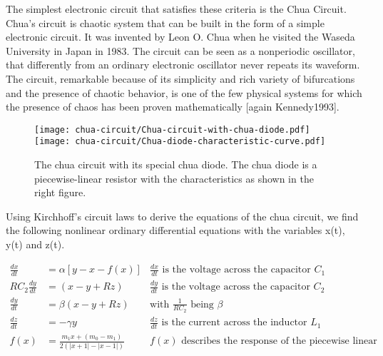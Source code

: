 \documentclass[main]{subfiles}
\begin{document}
The simplest electronic circuit that satisfies these criteria is the Chua Circuit. Chua's circuit is chaotic system that can be built in the form of a simple electronic circuit. It was invented by Leon O. Chua when he visited the Waseda University in Japan in 1983. The circuit can be seen as a nonperiodic oscillator, that differently from an ordinary electronic oscillator never repeats its waveform. The circuit, remarkable because of its simplicity and rich variety of bifurcations and the presence of chaotic behavior, is one of the few physical systems for which the presence of chaos has been proven mathematically [again Kennedy1993].

\begin{figure}[H]
\centering
\texttt{[image: chua-circuit/Chua-circuit-with-chua-diode.pdf]}
\texttt{[image: chua-circuit/Chua-diode-characteristic-curve.pdf]}
\caption[The chua circuit]{The chua circuit with its special chua diode. The chua diode is a piecewise-linear resistor with the characteristics as shown in the right figure.}
\label{figure:chuacircuit}
\end{figure}

Using Kirchhoff's circuit laws to derive the equations of the chua circuit, we find the following nonlinear ordinary differential equations with the variables x(t), y(t) and z(t).

\begin{align*}
\frac{dx}{dt}&=\alpha [y-x-f(x)] &\frac{dx}{dt}\text{ is the voltage across the capacitor }C_1\\
RC_2\frac{dy}{dt}&= (x-y+Rz) &\frac{dy}{dt}\text{ is the voltage across the capacitor }C_2\\
\frac{dy}{dt}&=\beta (x-y+Rz) &\text{with } \frac{1}{RC_2} \text{ being }\beta\\
\frac{dz}{dt}&=-\gamma y &\frac{dz}{dt}\text{ is the current across the inductor }L_1\\
f (x) &= \frac{m_1 x + (m_0 - m_1)}{2 (| x + 1 | -| x - 1 |)} &f(x)\text{ describes the response of the piecewise linear resistor}
\end{align*}

\begin{comment}
dx/dt = c1*(y - x - f (x)) // m0 : slope in outer region
    dy/dt = c2*(x - y + z)    // m1 : slope in inner region
    dz/dt = -c3*y         // b : Breakpoints
    f (x) = m1*x + (m0 - m1)/2*(| x + 1 | -| x - 1 |)
\end{comment}
\end{document}
